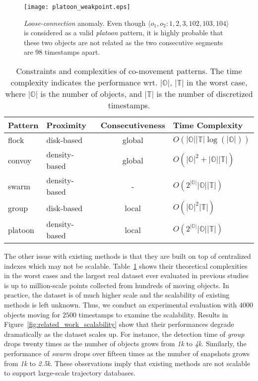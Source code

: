 \begin{figure}[h]
\center
\texttt{[image: platoon\_weakpoint.eps]}
\caption{\emph{Loose-connection} anomaly. Even though $\langle o_1, o_2: 1,2,3,102,103,104 \rangle$ is considered as a valid \emph{platoon} pattern, it is highly probable that these two objects are not related as the two consecutive segments  are 98 timestamps apart. 
}
\label{fig:platoon_weakpoint}
\end{figure}

\begin{table} \scriptsize
\centering
\begin{tabular}{|l|l|c|l|}
\hline 
\textbf{Pattern} & {\tiny \textbf{Proximity}} & {\tiny \textbf{Consecutiveness}} & {\tiny \textbf{Time Complexity}}\\ 
\hline 
flock~\cite{gudmundsson2004flock} & disk-based &  global & {\tiny $O(|\mathbb{O}||\mathbb{T}|\log(|\mathbb{O}|))$} \\ 
\hline 
convoy~\cite{jeung2008convoy} & density-based &   global & {\tiny $O(|\mathbb{O}|^2+|\mathbb{O}||\mathbb{T}|)$}\\ 
\hline 
swarm~\cite{li2010swarm} & density-based  & - & {\tiny $O(2^{|\mathbb{O}|}|\mathbb{O}||\mathbb{T}|)$}  \\ 
\hline 
group~\cite{wang2006grouppattern} & disk-based &  local & {\tiny $O(|\mathbb{O}|^2|\mathbb{T}|)$}\\ 
\hline 
platoon~\cite{li2015platoon} & density-based &  local & {\tiny $O(2^{|\mathbb{O}|}|\mathbb{O}||\mathbb{T}|)$}\\ 
\hline 
\end{tabular} 
\caption{Constraints and complexities of co-movement patterns. The time complexity indicates the performance wrt.
$|\mathbb{O}|$, $|\mathbb{T}|$ in the worst case, where $|\mathbb{O}|$ is the number of objects, and $|\mathbb{T}|$ is the number of discretized timestamps.}
\label{tbl:existing_co_patterns}
\end{table}
The other issue with existing methods is that they are built on top of centralized indexes which may not be scalable. Table~\ref{tbl:existing_co_patterns} shows their theoretical complexities in the worst cases and the largest real dataset ever evaluated in previous studies is up to million-scale points collected from hundreds of moving objects. In practice, the dataset is of much higher scale and the scalability of existing methods is left unknown. Thus, we conduct an experimental evaluation with $4000$ objects moving for $2500$ timestamps to examine the scalability. Results in Figure~\ref{fig:related_work_scalability} show that their performances degrade dramatically as the dataset scales up. For instance, the detection time of \emph{group} drops twenty times as the number of objects grows from \emph{1k} to \emph{4k}. Similarly,
the performance of \emph{swarm} drops over fifteen times as the number of snapshots grows from \emph{1k} to \emph{2.5k}.
These observations imply that existing methods are not scalable to support large-scale trajectory databases. 

